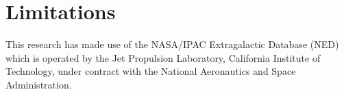 \documentclass[iop]{emulateapj-rtx4}
\begin{document}
\section{Limitations}

This research has made use of the NASA/IPAC Extragalactic Database (NED) which is operated by the Jet Propulsion Laboratory, California Institute of Technology, under contract with the National Aeronautics and Space Administration. 



{}

\end{document}
